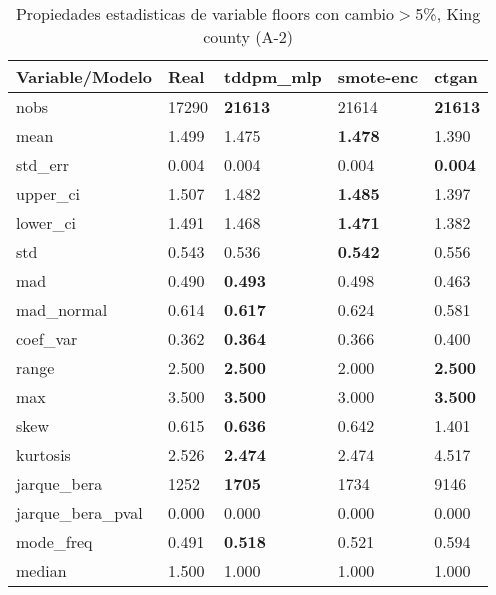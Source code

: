 \begin{table}[H]
\centering
\fontsize{8}{14}\selectfont
\caption{Propiedades estadisticas de variable floors con cambio\ensuremath{>}5\%, King county (A-2)}
\label{table-stats-king county-a-2-floors-short}
\begin{tabular}{|l|m{10em}|m{10em}|m{10em}|m{10em}|}
\hline
 \rowcolor[gray]{0.8}
Variable/Modelo & Real & tddpm\_mlp & smote-enc & ctgan \\
\hline nobs & 17290 & \bfseries 21613 & \cellcolor[rgb]{0.9, 0.54, 0.52} 21614 & \bfseries 21613 \\
\hline mean & 1.499 & 1.475 & \bfseries 1.478 & \cellcolor[rgb]{0.9, 0.54, 0.52} 1.390 \\
\hline std\_err & 0.004 & \cellcolor[rgb]{0.9, 0.54, 0.52} 0.004 & 0.004 & \bfseries 0.004 \\
\hline upper\_ci & 1.507 & 1.482 & \bfseries 1.485 & \cellcolor[rgb]{0.9, 0.54, 0.52} 1.397 \\
\hline lower\_ci & 1.491 & 1.468 & \bfseries 1.471 & \cellcolor[rgb]{0.9, 0.54, 0.52} 1.382 \\
\hline std & 0.543 & 0.536 & \bfseries 0.542 & \cellcolor[rgb]{0.9, 0.54, 0.52} 0.556 \\
\hline mad & 0.490 & \bfseries 0.493 & 0.498 & \cellcolor[rgb]{0.9, 0.54, 0.52} 0.463 \\
\hline mad\_normal & 0.614 & \bfseries 0.617 & 0.624 & \cellcolor[rgb]{0.9, 0.54, 0.52} 0.581 \\
\hline coef\_var & 0.362 & \bfseries 0.364 & 0.366 & \cellcolor[rgb]{0.9, 0.54, 0.52} 0.400 \\
\hline range & 2.500 & \bfseries 2.500 & \cellcolor[rgb]{0.9, 0.54, 0.52} 2.000 & \bfseries 2.500 \\
\hline max & 3.500 & \bfseries 3.500 & \cellcolor[rgb]{0.9, 0.54, 0.52} 3.000 & \bfseries 3.500 \\
\hline skew & 0.615 & \bfseries 0.636 & 0.642 & \cellcolor[rgb]{0.9, 0.54, 0.52} 1.401 \\
\hline kurtosis & 2.526 & \bfseries 2.474 & 2.474 & \cellcolor[rgb]{0.9, 0.54, 0.52} 4.517 \\
\hline jarque\_bera & 1252 & \bfseries 1705 & 1734 & \cellcolor[rgb]{0.9, 0.54, 0.52} 9146 \\
\hline jarque\_bera\_pval & 0.000 & 0.000 & 0.000 & 0.000 \\
\hline mode\_freq & 0.491 & \bfseries 0.518 & 0.521 & \cellcolor[rgb]{0.9, 0.54, 0.52} 0.594 \\
\hline median & 1.500 & 1.000 & 1.000 & 1.000 \\
\hline
\end{tabular}
\end{table}
